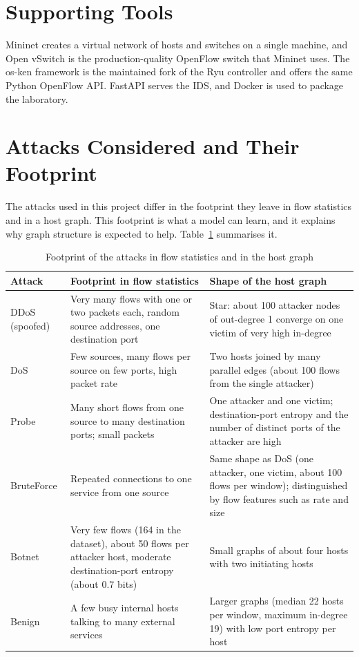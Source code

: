 \section{Supporting Tools}

Mininet \cite{bib:mininet} creates a virtual network of hosts and switches on a single machine, and Open vSwitch \cite{bib:ovs} is the production-quality OpenFlow switch that Mininet uses. The os-ken framework is the maintained fork of the Ryu controller and offers the same Python OpenFlow API. FastAPI serves the IDS, and Docker is used to package the laboratory.


\section{Attacks Considered and Their Footprint}

The attacks used in this project differ in the footprint they leave in flow statistics and in a host graph. This footprint is what a model can learn, and it explains why graph structure is expected to help. Table~\ref{tab:footprint} summarises it.

\begin{table}[htbp]
\centering
\caption{Footprint of the attacks in flow statistics and in the host graph}
\label{tab:footprint}
\small
\begin{tabularx}{\textwidth}{|p{2.2cm}|X|X|}
\hline
\textbf{Attack} & \textbf{Footprint in flow statistics} & \textbf{Shape of the host graph} \\ \hline
DDoS (spoofed) & Very many flows with one or two packets each, random source addresses, one destination port & Star: about 100 attacker nodes of out-degree 1 converge on one victim of very high in-degree \\ \hline
DoS & Few sources, many flows per source on few ports, high packet rate & Two hosts joined by many parallel edges (about 100 flows from the single attacker) \\ \hline
Probe & Many short flows from one source to many destination ports; small packets & One attacker and one victim; destination-port entropy and the number of distinct ports of the attacker are high \\ \hline
BruteForce & Repeated connections to one service from one source & Same shape as DoS (one attacker, one victim, about 100 flows per window); distinguished by flow features such as rate and size \\ \hline
Botnet & Very few flows (164 in the dataset), about 50 flows per attacker host, moderate destination-port entropy (about 0.7 bits) & Small graphs of about four hosts with two initiating hosts \\ \hline
Benign & A few busy internal hosts talking to many external services & Larger graphs (median 22 hosts per window, maximum in-degree 19) with low port entropy per host \\ \hline
\end{tabularx}
\end{table}

